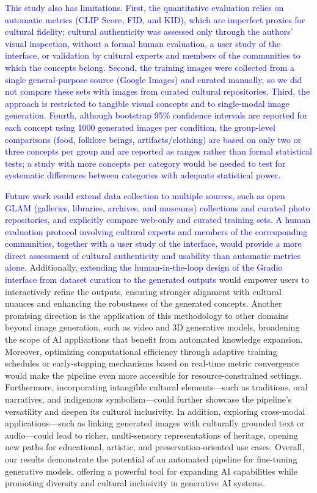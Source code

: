 \documentclass[pdflatex,sn-mathphys-num]{sn-jnl}%
\theoremstyle{thmstyleone}%
\theoremstyle{thmstyletwo}%
\theoremstyle{thmstylethree}%
\begin{document}
\textcolor{blue}{This study also has limitations. First, the quantitative evaluation relies on automatic metrics (CLIP Score, FID, and KID), which are imperfect proxies for cultural fidelity; cultural authenticity was assessed only through the authors' visual inspection, without a formal human evaluation, a user study of the interface, or validation by cultural experts and members of the communities to which the concepts belong. Second, the training images were collected from a single general-purpose source (Google Images) and curated manually, so we did not compare these sets with images from curated cultural repositories. Third, the approach is restricted to tangible visual concepts and to single-modal image generation. Fourth, although bootstrap 95\% confidence intervals are reported for each concept using 1000 generated images per condition, the group-level comparisons (food, folklore beings, artifacts/clothing) are based on only two or three concepts per group and are reported as ranges rather than formal statistical tests; a study with more concepts per category would be needed to test for systematic differences between categories with adequate statistical power.}

\textcolor{blue}{Future work could extend data collection to multiple sources, such as open GLAM (galleries, libraries, archives, and museums) collections and curated photo repositories, and explicitly compare web-only and curated training sets. A human evaluation protocol involving cultural experts and members of the corresponding communities, together with a user study of the interface, would provide a more direct assessment of cultural authenticity and usability than automatic metrics alone.} Additionally, \textcolor{blue}{extending the human-in-the-loop design of the Gradio interface from dataset curation to the generated outputs} would empower users to interactively refine the outputs, ensuring stronger alignment with cultural nuances and enhancing the robustness of the generated concepts. Another promising direction is the application of this methodology to other domains beyond image generation, such as video and 3D generative models, broadening the scope of AI applications that benefit from automated knowledge expansion. Moreover, optimizing computational efficiency through adaptive training schedules or early-stopping mechanisms based on real-time metric convergence would make the pipeline even more accessible for resource-constrained settings. Furthermore, incorporating intangible cultural elements—such as traditions, oral narratives, and indigenous symbolism—could further showcase the pipeline’s versatility and deepen its cultural inclusivity. In addition, exploring cross-modal applications—such as linking generated images with culturally grounded text or audio—could lead to richer, multi-sensory representations of heritage, opening new paths for educational, artistic, and preservation-oriented use cases. Overall, our results demonstrate the potential of an automated pipeline for fine-tuning generative models, offering a powerful tool for expanding AI capabilities while promoting diversity and cultural inclusivity in generative AI systems.
\end{document}
